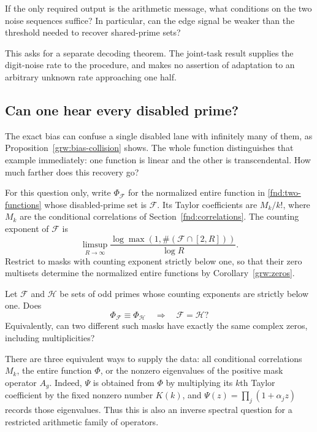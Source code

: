 \begin{question}\label{rec:message-only-question}
If the only required output is the arithmetic message, what conditions
on the two noise sequences suffice? In particular, can the edge signal
be weaker than the threshold needed to recover shared-prime sets?
\end{question}

This asks for a separate decoding theorem.  The joint-task result
supplies the digit-noise rate to the procedure, and makes no assertion
of adaptation to an arbitrary unknown rate approaching one half.

\subsection{Can one hear every disabled prime?}

The exact bias can confuse a single disabled lane with infinitely
many of them, as Proposition~\ref{grw:bias-collision} shows.  The
whole function distinguishes that example immediately: one function
is linear and the other is transcendental.  How much farther does
this recovery go?

For this question only, write $\Phi_{\mathcal F}$ for the normalized
entire function in \eqref{fnd:two-functions} whose disabled-prime set
is $\mathcal F$.  Its Taylor coefficients are $M_k/k!$, where $M_k$
are the conditional correlations of Section~\ref{fnd:correlations}.
The counting exponent of
$\mathcal F$ is
\[
 \limsup_{R\to\infty}
 \frac{\log\max(1,\#(\mathcal F\cap[2,R]))}{\log R}.
\]
Restrict to masks with counting exponent strictly below one, so that
their zero multisets determine the normalized entire functions by
Corollary~\ref{grw:zeros}.

\begin{question}\label{play:mask-rigidity}
Let $\mathcal F$ and $\mathcal H$ be sets of odd primes whose
counting exponents are strictly below one.  Does
\[
 \Phi_{\mathcal F}\equiv\Phi_{\mathcal H}
 \quad\Longrightarrow\quad \mathcal F=\mathcal H?
\]
Equivalently, can two different such masks have exactly the same
complex zeros, including multiplicities?
\end{question}

There are three equivalent ways to supply the data: all conditional
correlations $M_k$, the entire function $\Phi$, or the nonzero
eigenvalues of the positive mask operator $A_g$.  Indeed,
$\Psi$ is obtained from $\Phi$ by multiplying its $k$th Taylor
coefficient by the fixed nonzero number $K(k)$, and
$\Psi(z)=\prod_j(1+\alpha_jz)$ records those eigenvalues.
Thus this is also an inverse spectral question for a restricted
arithmetic family of operators.

